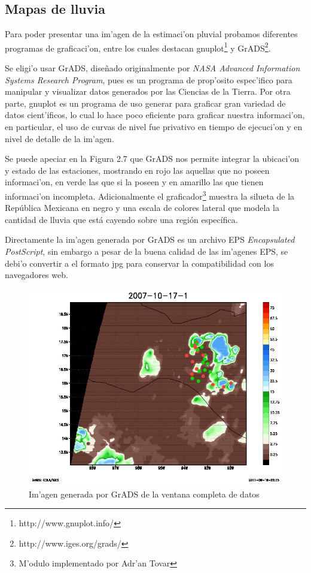 \subsection{Mapas de lluvia}

Para poder presentar una im'agen de la estimaci'on pluvial probamos diferentes programas de graficaci'on, entre los cuales
destacan gnuplot\footnote{http://www.gnuplot.info/} y GrADS\footnote{http://www.iges.org/grads/}.

Se eligi'o usar GrADS, dise\~nado originalmente por \textit{ NASA Advanced Information Systems Research Program}, 
pues es un programa de prop'osito espec'ifico para manipular y visualizar datos generados por las Ciencias 
de la Tierra. Por otra parte, gnuplot es un programa de uso generar para graficar gran variedad de datos cient'ificos, lo cual
lo hace poco eficiente para graficar nuestra informaci'on, en particular, el uso de curvas de nivel fue privativo en tiempo
de ejecuci'on y en nivel de detalle de la im'agen.

Se puede apeciar en la Figura 2.7 que GrADS nos permite integrar la ubicaci'on y estado de las estaciones,
mostrando en rojo las aquellas que no poseen informaci'on, en verde las que si la poseen y en amarillo las que 
tienen informaci'on incompleta. Adicionalmente el graficador\footnote{M'odulo implementado por Adr'an Tovar} 
muestra la silueta de la Rep\'ublica Mexicana en negro y una escala de colores
lateral que modela la cantidad de lluvia que est\'a cayendo sobre una regi\'on espec\'ifica.

Directamente la im'agen generada por GrADS es un archivo EPS \textit{Encapsulated PostScript}, sin embargo a pesar de la buena calidad
de las im'agenes EPS, se debi'o convertir a el formato jpg para conservar la compatibilidad con los navegadores web.

\begin{figure}[h!]
 \centering
 \includegraphics[width=130mm]{./imagenes/2007_10_17_1.jpg}
 \caption{Im'agen generada por GrADS de la ventana completa de datos}
\end{figure}

